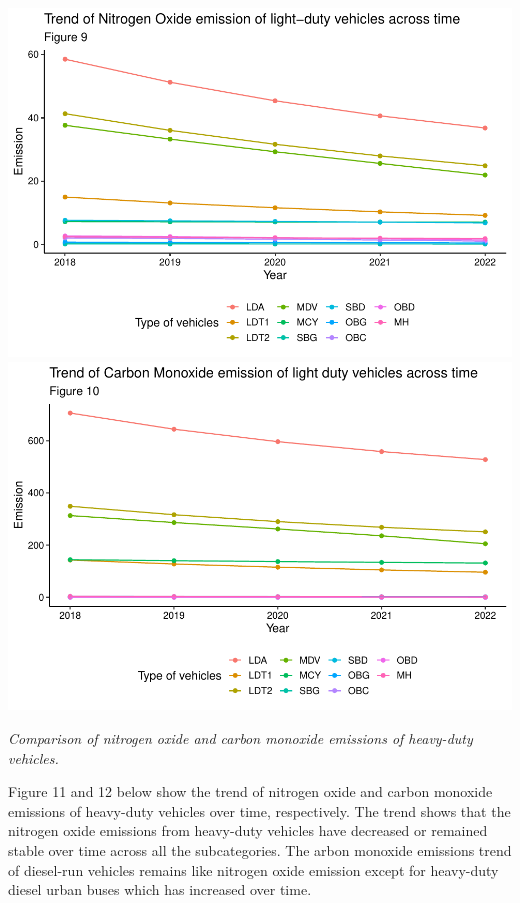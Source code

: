 \documentclass[
  12pt,
]{article}
\begin{document}
\includegraphics{Code_Main-Markdown_files/figure-latex/unnamed-chunk-7-1.pdf}
\includegraphics{Code_Main-Markdown_files/figure-latex/unnamed-chunk-7-2.pdf}

\emph{Comparison of nitrogen oxide and carbon monoxide emissions of
heavy-duty vehicles.}

Figure 11 and 12 below show the trend of nitrogen oxide and carbon
monoxide emissions of heavy-duty vehicles over time, respectively. The
trend shows that the nitrogen oxide emissions from heavy-duty vehicles
have decreased or remained stable over time across all the
subcategories. The arbon monoxide emissions trend of diesel-run vehicles
remains like nitrogen oxide emission except for heavy-duty diesel urban
buses which has increased over time.
\end{document}
